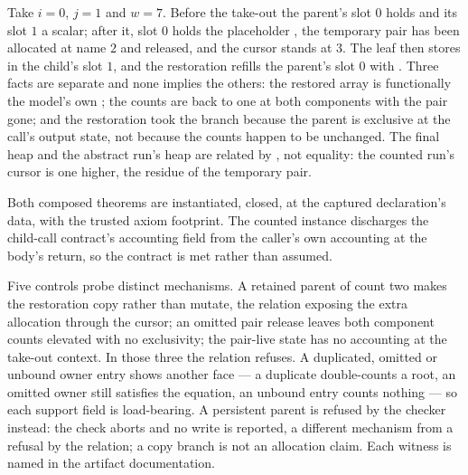 \documentclass[a4paper,UKenglish,cleveref]{lipics-v2021}
\begin{document}
Take $i = 0$, $j = 1$ and $w = 7$. Before the take-out the parent's slot $0$
holds  and its slot $1$ a scalar; after it, slot $0$ holds the
placeholder , the temporary pair has been allocated at name $2$
and released, and the cursor stands at $3$. The leaf then stores
 in the child's slot $1$, and the restoration refills the parent's
slot $0$ with . Three facts are separate and none implies the others:
the restored array is functionally the model's own ; the counts are back
to one at both components with the pair gone; and the restoration took the
 branch because the parent is exclusive at the call's output state,
not because the counts happen to be unchanged. The final heap and the abstract
run's heap are related by , not equality: the counted run's
cursor is one higher, the residue of the temporary pair.

Both composed theorems are instantiated, closed, at the captured declaration's
data, with the trusted axiom footprint. The counted instance discharges the
child-call contract's accounting field from the caller's own accounting at the
body's return, so the contract is met rather than assumed.

Five controls probe distinct mechanisms. A retained parent of count two makes the restoration copy rather than mutate, the
relation exposing the extra allocation through the cursor; an omitted pair release
leaves both component counts elevated with no exclusivity; the pair-live state has
no accounting at the take-out context. In those three the relation refuses. A
duplicated, omitted or unbound owner entry shows another face --- a duplicate
double-counts a root, an omitted owner still satisfies the equation, an unbound
entry counts nothing --- so each support field is load-bearing. A persistent parent
is refused by the checker instead: the check aborts and no write is reported, a
different mechanism from a refusal by the relation; a copy branch is not an
allocation claim. Each witness is named in the artifact documentation.
\end{document}
